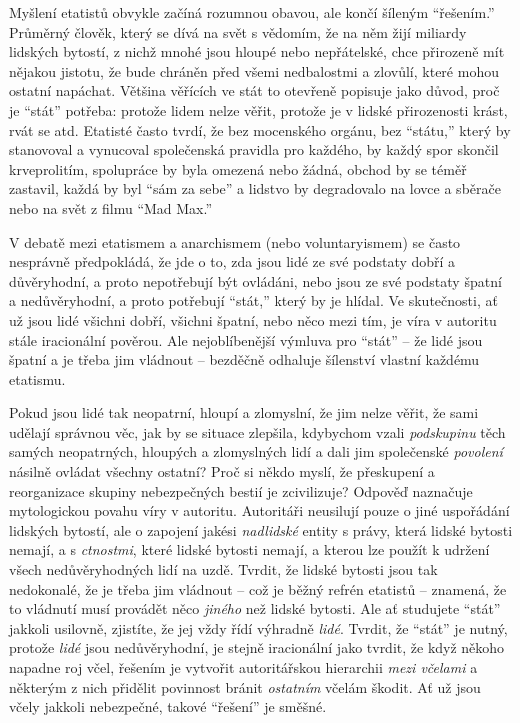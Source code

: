 \documentclass{book}
\begin{document}
Myšlení etatistů obvykle začíná rozumnou obavou, ale končí šíleným \enquote{řešením.} Průměrný člověk, který se dívá na svět s vědomím, že na něm žijí miliardy lidských bytostí, z nichž mnohé jsou hloupé nebo nepřátelské, chce přirozeně mít nějakou jistotu, že bude chráněn před všemi nedbalostmi a zlovůlí, které mohou ostatní napáchat. Většina věřících ve stát to otevřeně popisuje jako důvod, proč je \enquote{stát} potřeba: protože lidem nelze věřit, protože je v lidské přirozenosti krást, rvát se atd. Etatisté často tvrdí, že bez mocenského orgánu, bez \enquote{státu,} který by stanovoval a vynucoval společenská pravidla pro každého, by každý spor skončil krveprolitím, spolupráce by byla omezená nebo žádná, obchod by se téměř zastavil, každá by byl \enquote{sám za sebe} a lidstvo by degradovalo na lovce a sběrače nebo na svět z filmu \enquote{Mad Max.}

V debatě mezi etatismem a anarchismem (nebo voluntaryismem) se často nesprávně předpokládá, že jde o to, zda jsou lidé ze své podstaty dobří a důvěryhodní, a proto nepotřebují být ovládáni, nebo jsou ze své podstaty špatní a nedůvěryhodní, a proto potřebují \enquote{stát,} který by je hlídal. Ve skutečnosti, ať už jsou lidé všichni dobří, všichni špatní, nebo něco mezi tím, je víra v autoritu stále iracionální pověrou. Ale nejoblíbenější výmluva pro \enquote{stát} -- že lidé jsou špatní a je třeba jim vládnout -- bezděčně odhaluje šílenství vlastní každému etatismu.

Pokud jsou lidé tak neopatrní, hloupí a zlomyslní, že jim nelze věřit, že sami udělají správnou věc, jak by se situace zlepšila, kdybychom vzali \emph{podskupinu} těch samých neopatrných, hloupých a zlomyslných lidí a dali jim společenské \emph{povolení} násilně ovládat všechny ostatní? Proč si někdo myslí, že přeskupení a reorganizace skupiny nebezpečných bestií je zcivilizuje? Odpověď naznačuje mytologickou povahu víry v autoritu. Autoritáři neusilují pouze o jiné uspořádání lidských bytostí, ale o zapojení jakési \emph{nadlidské} entity s právy, která lidské bytosti nemají, a s \emph{ctnostmi}, které lidské bytosti nemají, a kterou lze použít k udržení všech nedůvěryhodných lidí na uzdě. Tvrdit, že lidské bytosti jsou tak nedokonalé, že je třeba jim vládnout -- což je běžný refrén etatistů -- znamená, že to vládnutí musí provádět něco \emph{jiného} než lidské bytosti. Ale ať studujete \enquote{stát} jakkoli usilovně, zjistíte, že jej vždy řídí výhradně \emph{lidé}. Tvrdit, že \enquote{stát} je nutný, protože \emph{lidé} jsou nedůvěryhodní, je stejně iracionální jako tvrdit, že když někoho napadne roj včel, řešením je vytvořit autoritářskou hierarchii \emph{mezi včelami} a některým z nich přidělit povinnost bránit \emph{ostatním} včelám škodit. Ať už jsou včely jakkoli nebezpečné, takové \enquote{řešení} je směšné.
\end{document}
